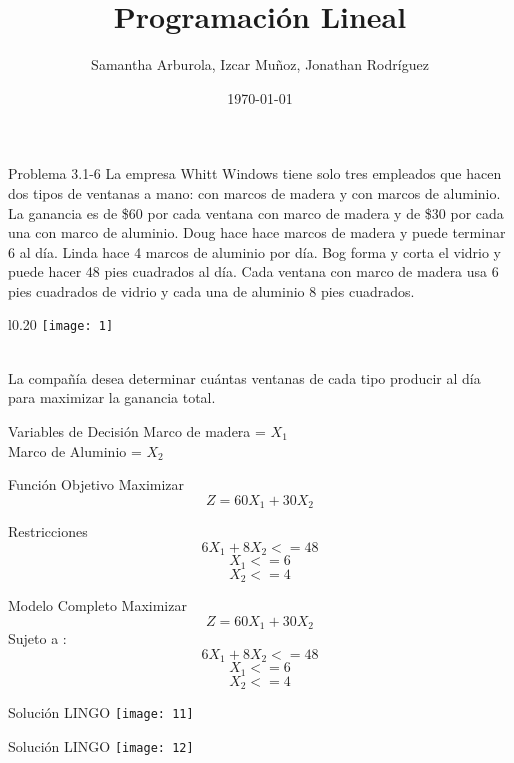 \documentclass{beamer}
\author{Samantha Arburola, Izcar Muñoz, Jonathan Rodríguez}
\title{Programación Lineal}
\date{\today}
\begin{document}
\titlepageframe

\begin{frame}[t,fragile]{Problema 3.1-6}
La empresa Whitt Windows tiene solo tres empleados que hacen dos tipos de ventanas a mano: con marcos de madera y con marcos de aluminio. La ganancia es de \$60 por cada ventana con marco de madera y de \$30 por cada una con marco de aluminio. Doug hace hace marcos de madera y puede terminar 6 al día. Linda hace 4  marcos de aluminio por día. Bog forma y corta el vidrio y puede hacer 48 pies cuadrados al día. Cada ventana con marco de madera usa 6 pies cuadrados de vidrio y cada una de aluminio 8 pies cuadrados.\\ 
\begin{wrapfigure}{l}{0.20\textwidth}
    \centering
    \texttt{[image: 1]}
\end{wrapfigure}\\
La compañía desea determinar cuántas ventanas de cada tipo producir al día para maximizar la ganancia total.\\

\end{frame}

\begin{frame}[fragile]{Variables de Decisión}
Marco de madera  = \(X_{1}\) \\
Marco de Aluminio = \(X_{2}\)
\end{frame}

\begin{frame}[fragile]{Función Objetivo}
Maximizar\\
\[Z = 60X_{1} + 30X_{2}\]
\end{frame}

\begin{frame}[fragile]{Restricciones}
\[6X_{1} + 8X_{2} <= 48\]
\[  X_{1} <= 6\]
\[  X_{2} <= 4\]
\end{frame}

\begin{frame}[fragile]{Modelo Completo}
Maximizar\\
\[Z = 60X_{1} + 30X_{2}\]
Sujeto a :\\
\[  6X_{1} + 8X_{2} <= 48\]
\[  X_{1} <= 6\]
\[  X_{2} <= 4\]
\end{frame}

\begin{frame}[fragile]{Solución LINGO}
\texttt{[image: 11]}
\end{frame}

\begin{frame}[fragile]{Solución LINGO}
    \texttt{[image: 12]}
\end{frame}
\end{document}
